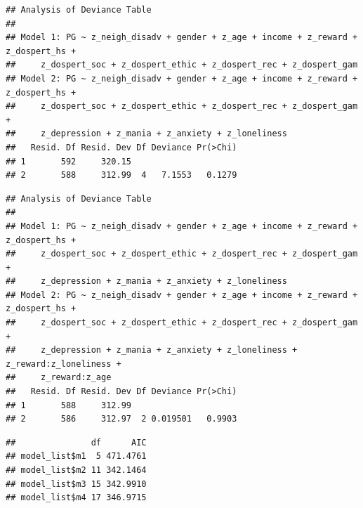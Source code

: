 \documentclass[
]{article}
\newenvironment{Shaded}{\begin{snugshade}}{\end{snugshade}}
\newcommand{\NormalTok}[1]{#1}
\newcommand{\SpecialCharTok}[1]{\textcolor[rgb]{0.81,0.36,0.00}{\textbf{#1}}}
\begin{document}
\begin{Shaded}
\end{Shaded}

\begin{verbatim}
## Analysis of Deviance Table
## 
## Model 1: PG ~ z_neigh_disadv + gender + z_age + income + z_reward + z_dospert_hs + 
##     z_dospert_soc + z_dospert_ethic + z_dospert_rec + z_dospert_gam
## Model 2: PG ~ z_neigh_disadv + gender + z_age + income + z_reward + z_dospert_hs + 
##     z_dospert_soc + z_dospert_ethic + z_dospert_rec + z_dospert_gam + 
##     z_depression + z_mania + z_anxiety + z_loneliness
##   Resid. Df Resid. Dev Df Deviance Pr(>Chi)
## 1       592     320.15                     
## 2       588     312.99  4   7.1553   0.1279
\end{verbatim}

\begin{Shaded}
\end{Shaded}

\begin{verbatim}
## Analysis of Deviance Table
## 
## Model 1: PG ~ z_neigh_disadv + gender + z_age + income + z_reward + z_dospert_hs + 
##     z_dospert_soc + z_dospert_ethic + z_dospert_rec + z_dospert_gam + 
##     z_depression + z_mania + z_anxiety + z_loneliness
## Model 2: PG ~ z_neigh_disadv + gender + z_age + income + z_reward + z_dospert_hs + 
##     z_dospert_soc + z_dospert_ethic + z_dospert_rec + z_dospert_gam + 
##     z_depression + z_mania + z_anxiety + z_loneliness + z_reward:z_loneliness + 
##     z_reward:z_age
##   Resid. Df Resid. Dev Df Deviance Pr(>Chi)
## 1       588     312.99                     
## 2       586     312.97  2 0.019501   0.9903
\end{verbatim}

\begin{Shaded}
\end{Shaded}

\begin{verbatim}
##               df      AIC
## model_list$m1  5 471.4761
## model_list$m2 11 342.1464
## model_list$m3 15 342.9910
## model_list$m4 17 346.9715
\end{verbatim}
\end{document}
